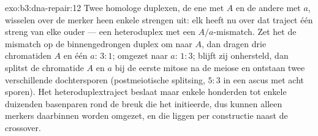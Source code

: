 \begin{solution}{exo:b3:dna-repair:12}
Twee homologe duplexen, de ene met $A$ en de andere met $a$, wisselen
over de merker heen enkele strengen uit: elk heeft nu over dat traject
één streng van elke ouder --- een heteroduplex met een
$A/a$-mismatch. Zet het  de mismatch op de binnengedrongen
duplex om naar $A$, dan dragen drie chromatiden $A$ en één $a$:
$3{:}1$; omgezet naar $a$: $1{:}3$; blijft zij onhersteld, dan splitst
de chromatide $A$ en $a$ bij de eerste mitose na de meiose en ontstaan
twee verschillende dochtersporen (postmeiotische splitsing, $5{:}3$ in
een ascus met acht sporen). Het heteroduplextraject beslaat maar enkele
honderden tot enkele duizenden basenparen rond de breuk die het
initieerde, dus kunnen alleen merkers daarbinnen worden omgezet, en
die liggen per constructie naast de crossover.
\end{solution}

